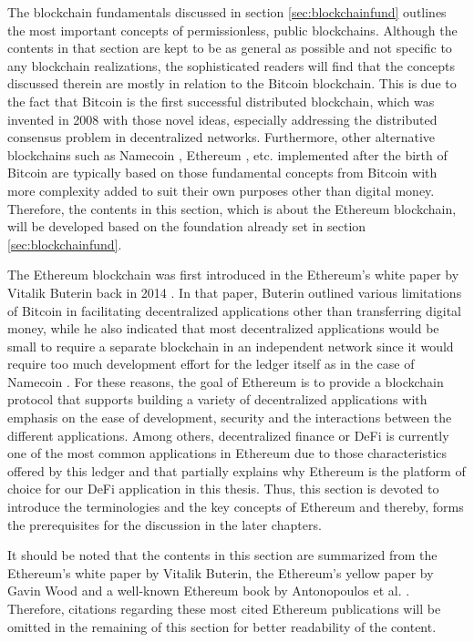 The blockchain fundamentals discussed in section \ref{sec:blockchainfund} outlines the most important concepts of permissionless, public blockchains. Although the contents in that section are kept to be as general as possible and not specific to any blockchain realizations, the sophisticated readers will find that the concepts discussed therein are mostly in relation to the Bitcoin blockchain. This is due to the fact that Bitcoin is the first successful distributed blockchain, which was invented in 2008 \cite{satoshi2008peer} with those novel ideas, especially addressing the distributed consensus problem in decentralized networks. Furthermore, other alternative blockchains such as Namecoin \cite{kalodner2015empirical}, Ethereum \cite{buterin2014next}, etc. implemented after the birth of Bitcoin are typically based on those fundamental concepts from Bitcoin with more complexity added to suit their own purposes other than digital money. Therefore, the contents in this section, which is about the Ethereum blockchain, will be developed based on the foundation already set in section \ref{sec:blockchainfund}.


The Ethereum blockchain was first introduced in the Ethereum's white paper by Vitalik Buterin back in 2014 \cite{buterin2014next}. In that paper, Buterin outlined various limitations of Bitcoin in facilitating decentralized applications other than transferring digital money, while he also indicated that most decentralized applications would be small to require a separate blockchain in an independent network since it would require too much development effort for the ledger itself as in the case of Namecoin \cite{kalodner2015empirical}. For these reasons, the goal of Ethereum is to provide a blockchain protocol that supports building a variety of decentralized applications with emphasis on the ease of development, security and the interactions between the different applications. Among others, decentralized finance or DeFi is currently one of the most common applications in Ethereum due to those characteristics offered by this ledger and that partially explains why Ethereum is the platform of choice for our DeFi application in this thesis. Thus, this section is devoted to introduce the terminologies and the key concepts of Ethereum and thereby, forms the prerequisites for the discussion in the later chapters. 

It should be noted that the contents in this section are summarized from the Ethereum's white paper \cite{buterin2014next} by Vitalik Buterin, the Ethereum's yellow paper by Gavin Wood \cite{wood2014ethereum} and a well-known Ethereum book by Antonopoulos et al. \cite{antonopoulos2018mastering}. Therefore, citations regarding these most cited Ethereum publications will be omitted in the remaining of this section for better readability of the content.

